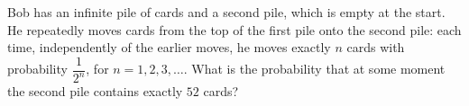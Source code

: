 Bob has an infinite pile of cards and a second pile, which is empty at the start. He repeatedly moves cards from the top of the first pile onto the second pile: each time, independently of the earlier moves, he moves exactly $n$ cards with probability $\dfrac{1}{2^n}$, for $n=1,2,3,\dots$. What is the probability that at some moment the second pile contains exactly $52$ cards?
